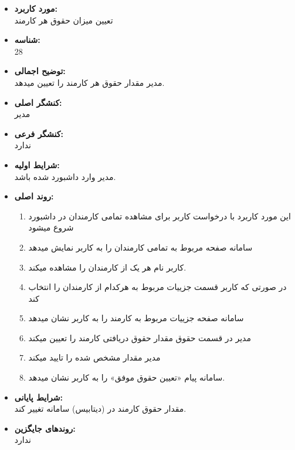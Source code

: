 \documentclass{article}
\begin{document}
\begin{itemize}
\item \textbf{مورد کاربرد:}\\
تعیین میزان حقوق هر کارمند
\item \textbf{شناسه:}\\
28
\item \textbf{توضیح اجمالی:}\\
مدیر مقدار حقوق هر کارمند را تعیین میدهد.
\item \textbf{کنشگر اصلی:}\\
مدیر
\item \textbf{کنشگر فرعی:}\\
ندارد
\item \textbf{شرایط اولیه:}\\
مدیر وارد داشبورد شده باشد.
\item \textbf{روند اصلی:}\\
\begin{enumerate}
\item  این مورد کاربرد با درخواست کاربر برای مشاهده تمامی  کارمندان در داشبورد شروع میشود
\item سامانه صفحه مربوط به تمامی کارمندان را به کاربر نمایش میدهد
\item کاربر نام هر یک از کارمندان را مشاهده میکند.
\item  در صورتی که کاربر قسمت جزییات مربوط به هرکدام از کارمندان را انتخاب کند
\item سامانه صفحه جزییات مربوط به کارمند را به کاربر نشان میدهد
\item مدیر در قسمت حقوق مقدار حقوق دریافتی کارمند را تعیین میکند
\item مدیر مقدار مشخص شده را تایید میکند
\item سامانه پیام «تعیین حقوق موفق» را به کاربر نشان میدهد.
\end{enumerate}
\item \textbf{شرایط پایانی:}\\ 
مقدار حقوق کارمند در (دیتابیس) سامانه تغییر کند.
\item \textbf{روندهای جایگزین:}\\
ندارد
\end{itemize}
\noindent\makebox[\linewidth]{\rule{\paperwidth}{0.4pt}}
\end{document}
